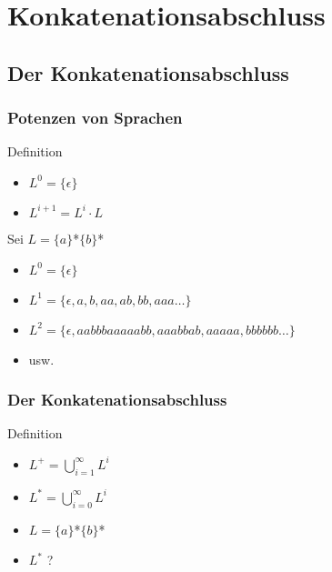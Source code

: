 \documentclass{beamer}
\begin{document}
\section{Konkatenationsabschluss}
\subsection[Der Konkatenationsabschluss]{Der Konkatenationsabschluss}
\begin{frame}
\frametitle{Potenzen von Sprachen}
\begin{block}{Definition}
\begin{itemize}
\item $L^{0} = \{\epsilon\}$
\item $L^{i+1} = L^{i} \cdot L$
\end{itemize}
\end{block}
\begin{example}
Sei $L = \{a\}$*$\{b\}$*
\begin{itemize}[<+->]
\item $L^{0} = \{\epsilon\}$
\item $L^{1} = \{\epsilon,a,b,aa,ab,bb,aaa\ldots\}$
\item $L^{2} = \{\epsilon,aabbbaaaaabb,aaabbab,aaaaa,bbbbbb\ldots\}$
\item usw.
\end{itemize}
\end{example}
\end{frame}
\begin{frame}
\frametitle{Der Konkatenationsabschluss}
\begin{block}{Definition}
\begin{itemize}[<+->]
\item $L^{+} = \bigcup\limits_{i = 1}^{\infty} L^{i}$
\item $L^{*} = \bigcup\limits_{i = 0}^{\infty} L^{i}$
\end{itemize}
\end{block}
\begin{example}
\begin{itemize}[<+->]
\item $L = \{a\}$*$\{b\}$*
\item $L^{*}$ ? 
\end{itemize}
\end{example}
\end{frame}
\end{document}
